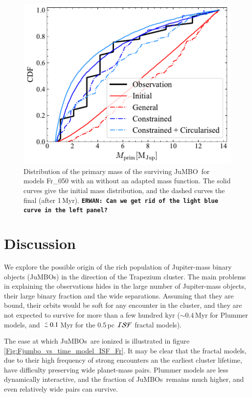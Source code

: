 \documentclass[submission,phys]{lib/SciPost}
\newcommand{\erwan}[1] {{\texttt{\textbf{ERWAN: #1}}} }
\def\aplt{\ {\raise-.5ex\hbox{$\buildrel<\over\sim$}}\ }
\newcommand{\jumbo}{\mbox{JuMBO}}
\newcommand{\jumbos}{\mbox{JuMBOs}}
\begin{document}
\begin{figure}
    \centering
    \includegraphics[width=0.75\columnwidth]{figures/Fractal_noFF_mprim_vs_obs_.pdf}
    \caption{Distribution of the primary mass of the surviving
      \jumbo\, for models Fr\_050 with an without an adapted mass
      function. The solid curves give the initial mass distribution,
      and the dashed curves the final (after 1\,Myr).  \erwan{Can we
        get rid of the light blue curve in the left panel?}}
         \label{Fig:Mdistr_F05}
\end{figure}

\section{Discussion}\label{Sect:Discussion}

We explore the possible origin of the rich population of Jupiter-mass
binary objects (\jumbos) in the direction of the Trapezium cluster.
The main problems in explaining the observations hides in the large
number of Jupiter-mass objects, their large binary fraction and the
wide separations. Assuming that they are bound, their orbits would be
soft for any encounter in the cluster, and they are not expected to
survive for more than a few hundred kyr ($\sim 0.4$\,Myr for Plummer
models, and $\aplt 0.1$\,Myr for the 0.5\,pc ${\cal ISF}$ fractal
models).

The ease at which \jumbos\, are ionized is illustrated in
figure\,\ref{Fig:Fjumbo_vs_time_model_ISF_Fr}. It may be clear that
the fractal models, due to their high frequency of strong encounters
an the earliest cluster lifetime, have difficulty preserving wide
planet-mass pairs. Plummer models are less dynamically interactive,
and the fraction of \jumbos\, remains much higher, and even relatively
wide pairs can survive.
\end{document}

